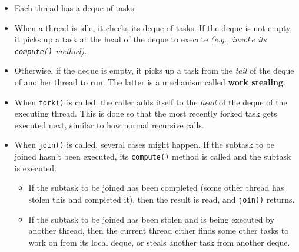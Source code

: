 \documentclass[10pt, landscape]{article}
\newcommand{\code}[1]{\textcolor{mygreen}{\texttt{#1}}}
\begin{document}
\begin{multicols}{2}
\begin{itemize}
    \item Each thread has a deque of tasks.
    \item When a thread is idle, it checks its deque of tasks. If the deque is not empty, it picks up a task at the head of the deque to execute \textit{(e.g., invoke its \code{compute()} method).}
    \item Otherwise, if the deque is empty, it picks up a task from the \textit{tail} of the deque of another thread to run. The latter is a mechanism called \textbf{work stealing}.
    \item When \code{fork()} is called, the caller adds itself to the \textit{head} of the deque of the executing thread. This is done so that the most recently forked task gets executed next, similar to how normal recursive calls.
    \item When \code{join()} is called, several cases might happen. If the subtask to be joined hasn't been executed, its \code{compute()} method is called and the subtask is executed.
    \begin{itemize}
        \item If the subtask to be joined has been completed (some other thread has stolen this and completed it), then the result is read, and \code{join()} returns.
        \item If the subtask to be joined has been stolen and is being executed by another thread, then the current thread either finds some other tasks to work on from its local deque, or steals another task from another deque.
    \end{itemize}
\end{itemize}




\end{multicols}

\hline
\end{document}

